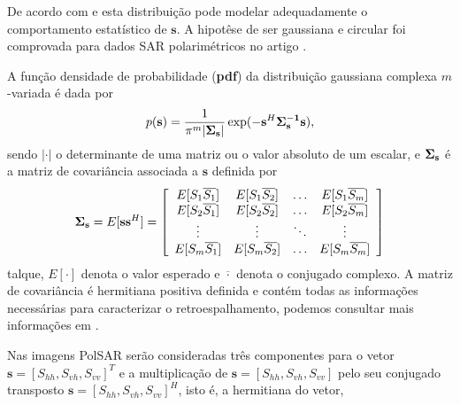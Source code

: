 



De acordo com \citet{good} e \citet{lee} esta distribuição pode modelar adequadamente o comportamento estatístico de $\mathbf{s}$. A hipotêse de ser gaussiana e circular foi comprovada para dados SAR polarimétricos no artigo \citet{sarabendi}.   

A função densidade de probabilidade ({\bf pdf}) da distribuição gaussiana complexa $m$-variada é dada por
\begin{equation}\label{cap_acf_4}
    p({\bf s})=\frac{1}{\pi^m|\bf{\Sigma}_{{\bf s}}|}\exp(-{\bf s}^{H}\bf{\Sigma}_{{\bf s}}^{-1}{\bf s}), 
\end{equation}
sendo $|\cdot|$ o determinante de uma matriz ou o valor absoluto de um escalar, e $\mathbf{\Sigma}_{\bf{s}}$ é a matriz de covariância associada a $\mathbf{s}$ definida por
\begin{equation}\label{cap_acf_5}
	{\bf \Sigma_{{\bf s}}} = E[{\mathbf s}{\mathbf s}^H] = \left[
\begin{array}{cccc}
	E[S_1\overline{S_1}]  & E[{S_1}\overline{S_2}] &\hdots & E[S_1\overline{S_m}] \\
	E[S_2\overline{S_1}]  & E[{S_2}\overline{S_2}] &\hdots &E[S_2\overline{S_m}]\\
        \vdots&\vdots &\ddots &\vdots\\
	E[S_m\overline{S_1}]  & E[S_m\overline{S_2}] &\hdots &E[S_m\overline{S_m}]\\
\end{array}
\right]
\end{equation}
talque, $E[\cdot]$ denota o valor esperado e $\overline{\cdot}$ denota o conjugado complexo. A matriz de covariância é hermitiana positiva definida e contém todas as informações necessárias para caracterizar o retroespalhamento, podemos consultar mais informações em \citep{mfp}. 

Nas imagens PolSAR serão consideradas três componentes para o vetor $\mathbf{s}=[S_{hh},S_{vh},S_{vv}]^T$ e a multiplicação de $\mathbf{s}=[S_{hh},S_{vh},S_{vv}]$ pelo seu conjugado transposto $\mathbf{s}=[S_{hh},S_{vh},S_{vv}]^H$, isto é, a hermitiana do vetor, 

